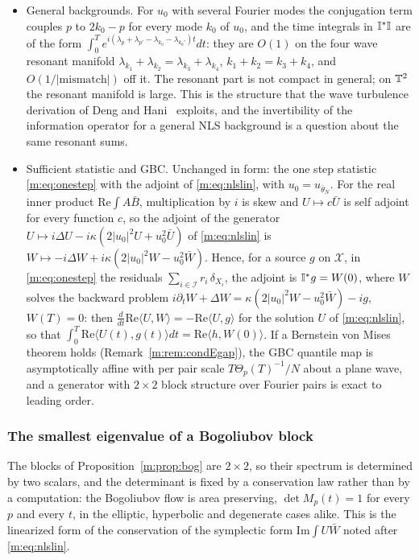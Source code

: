 \begin{itemize}[nosep]
\item General backgrounds. For $u_0$ with several Fourier modes the conjugation term couples $p$ to $2k_0-p$ for every mode $k_0$ of $u_0$, and the time integrals in $\mathbb{I}^*\mathbb{I}$ are of the form $\int_0^Te^{i(\lambda_{p}+\lambda_{p'}-\lambda_{k_0}-\lambda_{k_0'})t}dt$: they are $O(1)$ on the four wave resonant manifold $\lambda_{k_1}+\lambda_{k_2}=\lambda_{k_3}+\lambda_{k_4}$, $k_1+k_2=k_3+k_4$, and $O(1/|\text{mismatch}|)$ off it. The resonant part is not compact in general; on $\mathbb{T}^2$ the resonant manifold is large. This is the structure that the wave turbulence derivation of Deng and Hani~\cite{denghani2023} exploits, and the invertibility of the information operator for a general NLS background is a question about the same resonant sums.
\item Sufficient statistic and GBC. Unchanged in form: the one step statistic \eqref{m:eq:onestep} with the adjoint of \eqref{m:eq:nlslin}, with $u_0=u_{\bar\theta_N}$. For the real inner product $\mathrm{Re}\int A\bar B$, multiplication by $i$ is skew and $U\mapsto c\bar U$ is self adjoint for every function $c$, so the adjoint of the generator $U\mapsto i\Delta U-i\kappa(2|u_0|^2U+u_0^2\bar U)$ of \eqref{m:eq:nlslin} is $W\mapsto-i\Delta W+i\kappa(2|u_0|^2W-u_0^2\bar W)$. Hence, for a source $g$ on $\mathcal X$, in \eqref{m:eq:onestep} the residuals $\sum_{i\in\mathcal I}r_i\,\delta_{X_i}$, the adjoint is $\mathbb{I}^*g=W(0)$, where $W$ solves the backward problem $i\partial_tW+\Delta W=\kappa(2|u_0|^2W-u_0^2\bar W)-ig$, $W(T)=0$: then $\frac{d}{dt}\mathrm{Re}\langle U,W\rangle=-\mathrm{Re}\langle U,g\rangle$ for the solution $U$ of \eqref{m:eq:nlslin}, so that $\int_0^T\mathrm{Re}\langle U(t),g(t)\rangle dt=\mathrm{Re}\langle h,W(0)\rangle$. If a Bernstein von Mises theorem holds (Remark~\ref{m:rem:condEgap}), the GBC quantile map is asymptotically affine with per pair scale $T\Theta_p(T)^{-1}/N$ about a plane wave, and a generator with $2\times2$ block structure over Fourier pairs is exact to leading order.
\end{itemize}

\subsubsection{The smallest eigenvalue of a Bogoliubov block} The blocks of Proposition~\ref{m:prop:bog} are $2\times2$, so their spectrum is determined by two scalars, and the determinant is fixed by a conservation law rather than by a computation: the Bogoliubov flow is area preserving, $\det M_p(t)=1$ for every $p$ and every $t$, in the elliptic, hyperbolic and degenerate cases alike. This is the linearized form of the conservation of the symplectic form $\mathrm{Im}\int U\bar W$ noted after \eqref{m:eq:nlslin}.

